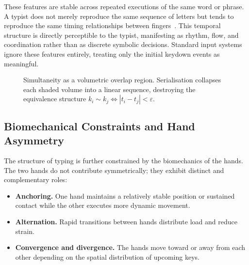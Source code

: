 \documentclass[11pt, a4paper]{article}
\begin{document}
These features are stable across repeated executions of the same word or
phrase. A typist does not merely reproduce the same sequence of letters
but tends to reproduce the same timing relationships between
fingers~\cite{monrose2000,gunetti2005}. This temporal structure is
directly perceptible to the typist, manifesting as rhythm, flow, and
coordination rather than as discrete symbolic decisions. Standard input
systems ignore these features entirely, treating only the initial keydown
events as meaningful.

\begin{figure}[h]
\centering
{}
\caption{Simultaneity as a volumetric overlap region. Serialisation collapses
each shaded volume into a linear sequence, destroying the equivalence
structure $k_i \sim k_j \iff |t_i - t_j| < \varepsilon$.}
\label{fig:overlap}
\end{figure}

\subsection{Biomechanical Constraints and Hand Asymmetry}

The structure of typing is further constrained by the biomechanics of
the hands. The two hands do not contribute symmetrically; they exhibit
distinct and complementary roles:

\begin{itemize}[leftmargin=2em]
  \item \textbf{Anchoring.} One hand maintains a relatively stable
    position or sustained contact while the other executes more dynamic
    movement.
  \item \textbf{Alternation.} Rapid transitions between hands distribute
    load and reduce strain.
  \item \textbf{Convergence and divergence.} The hands move toward or
    away from each other depending on the spatial distribution of
    upcoming keys.
\end{itemize}
\end{document}
